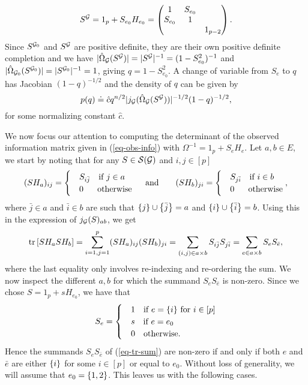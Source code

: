 \begin{equation*}
    S^{\mathcal{G}} = 1_p + S_{e_0} H_{e_0} = \begin{pmatrix}
        1   & S_{e_0} & \\
        S_{e_0} & 1 & \\
            &   & 1_{p-2}
    \end{pmatrix}.
\end{equation*}
Since $S^{{\mathcal{G}}_0}$ and $S^{\mathcal{G}}$ are positive definite, they are their own positive definite completion and we have $|\hat\Omega_{\mathcal{G}}(S^{\mathcal{G}})| = |S^{\mathcal{G}}|^{-1} = (1 - S_{e_0}^2)^{-1}$ and $|\hat\Omega_{{\mathcal{G}}_0}(S^{{\mathcal{G}}_0})| = |S^{{\mathcal{G}}_0}|^{-1} = 1$, giving $q = 1 - S_{e_0}^2$. A change of variable from $S_e$ to $q$ has Jacobian $(1 - q)^{-1/2}$ and the density of $q$ can be given by
\begin{equation*}
    p(q) \doteq \hat c q^{n/2} |j_{{\mathcal{G}}}(\hat\Omega_{{\mathcal{G}}}(S^{{\mathcal{G}}})) |^{-1/2} (1 - q)^{-1/2},
\end{equation*}
for some normalizing constant $\hat c$.

We now focus our attention to computing the determinant of the observed information matrix given in (\ref{eq-obs-info}) with $\Omega^{-1} = 1_p + S_e H_e$. Let $a, b \in E$, we start by noting that for any $S \in {\mathcal{S}}({\mathcal{G}})$ and $i, j \in [p]$
\begin{equation*}
    (SH_a)_{ij} = \begin{cases}
        & S_{i \bar j}\ \ \t{ if } j \in a\\
        &0\ \ \ \ \  \t{otherwise}
    \end{cases}
    \ \ \ \t{ and }\ \ \ \ \ 
    (SH_b)_{ji} = \begin{cases}
        & S_{j \bar i}\ \ \t{ if } i \in b\\
        &0\ \ \ \ \  \t{otherwise}
    \end{cases},
\end{equation*}
where $\bar j \in a$ and $\bar i \in b$ are such that ${\left\{j\right\}} \cup {\left\{\bar j\right\}} = a$ and ${\left\{i\right\}} \cup {\left\{\bar i\right\}} = b$. Using this in the expression of $j_{\mathcal{G}}(S)_{ab}$, we get
\begin{equation} \label{eq-tr-sum}
    {\textrm{tr}\left[SH_aSH_b\right]} = \sum_{i=1, j=1}^p (SH_a)_{ij}(SH_b)_{ji} = \sum_{(i, j) \in a \times b} S_{i \bar j} S_{j \bar i} = \sum_{e \in a \times b} S_e S_{\bar e},
\end{equation}
where the last equality only involves re-indexing and re-ordering the sum. We now inspect the different $a, b$ for which the summand $S_eS_{\bar e}$ is non-zero. Since we chose $S = 1_p + s H_{e_0}$, we have that
\begin{equation*}
    S_e = \begin{cases}
        &1\ \ {\textrm{ if }} e = {\left\{ i \right\}} {\textrm{ for }} i \in [p]\\
        &s\ \ {\textrm{ if }} e = e_0\\
        &0\ \ {\textrm{ otherwise}}.
    \end{cases}
\end{equation*}
Hence the summands $S_e S_{\bar e}$ of (\ref{eq-tr-sum}) are non-zero if and only if both $e$ and $\bar e$ are either ${\left\{i\right\}}$ for some $i \in [p]$ or equal to $e_0$. Without loss of generality, we will assume that $e_0 = {\left\{1, 2\right\}}$. This leaves us with the following cases. 

